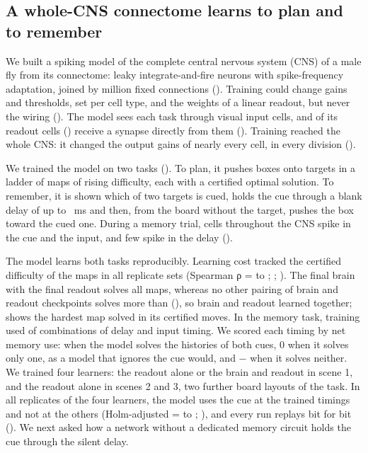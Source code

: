 
\subsection{A whole-CNS connectome learns to plan and to remember}

We built a spiking model of the complete central nervous system (CNS) of a male fly from its connectome:
 leaky integrate-and-fire neurons with spike-frequency adaptation, joined by  million fixed connections
(). Training could change  gains and thresholds, set per cell type, and the  weights of a linear
readout, but never the wiring (). The model sees each task through  visual input cells, and  of its
 readout cells () receive a synapse directly from them (). Training reached the whole CNS: it changed
the output gains of nearly every cell, in every division ().

We trained the model on two tasks (). To plan, it pushes boxes onto targets in a ladder of  maps of rising
difficulty, each with a certified optimal solution. To remember, it is shown which of two targets is cued, holds the cue through
a blank delay of up to ~ms and then, from the board without the target, pushes the box toward the cued one. During a
memory trial, cells throughout the CNS spike in the cue and the input, and few spike in the delay ().

The model learns both tasks reproducibly. Learning cost tracked the certified difficulty of the maps in all  replicate
sets (Spearman ρ =  to ; ; ). The final brain with the final readout solves all
 maps, whereas no other pairing of brain and readout checkpoints solves more than  (), so brain and
readout learned together;  shows the hardest map solved in its  certified moves. In the memory task, training
used  of  combinations of delay and input timing. We scored each timing by net memory use:  when the
model solves the histories of both cues, 0 when it solves only one, as a model that ignores the cue would, and $-$ when
it solves neither. We trained four learners: the readout alone or the brain and readout in scene 1, and the readout alone
in scenes 2 and 3, two further board layouts of the task. In all  replicates of the four learners, the model uses the
cue at the trained timings and not at the others (Holm-adjusted \Pv{} =  to ; ), and every run
replays bit for bit (). We next asked how a network without a dedicated memory circuit holds the cue through the
silent delay.

